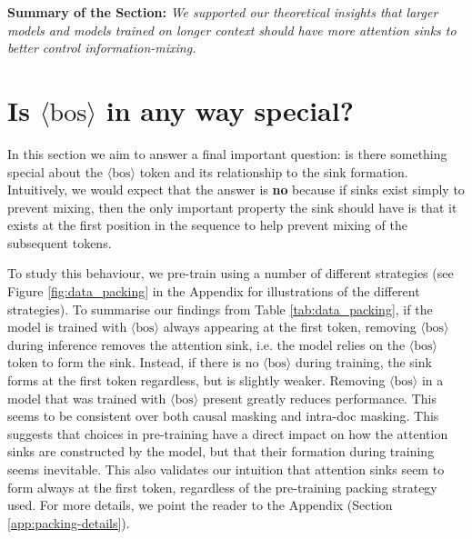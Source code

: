 \documentclass{article} %
\newcommand{\bos}{\ensuremath{\langle\text{bos}\rangle}\xspace}
\begin{document}
\begin{tcolorbox}[boxsep=0mm,left=2.5mm,right=2.5mm] \textbf{Summary of the Section:} {\em We supported our theoretical insights that larger models and models trained on longer context should have more attention sinks to better control information-mixing.}  
\end{tcolorbox}

\section{Is \bos in any way special?}
\label{sec:packing}

In this section we aim to answer a final important question: is there something special about the \bos token and its relationship to the sink formation. Intuitively, we would expect that the answer is \textbf{no} because if sinks exist simply to prevent mixing, then the only important property the sink should have is that it exists at the first position in the sequence to help prevent mixing of the subsequent tokens. 

To study this behaviour, we pre-train using a number of different strategies (see Figure \ref{fig:data_packing} in the Appendix for illustrations of the different strategies). To summarise our findings from Table \ref{tab:data_packing}, if the model is trained with \bos always appearing at the first token, removing \bos during inference removes the attention sink, i.e. the model relies on the \bos token to form the sink. Instead, if there is no \bos during training, the sink forms at the first token regardless, but is slightly weaker. Removing \bos in a model that was trained with \bos present greatly reduces performance. This seems to be consistent over both causal masking and intra-doc masking. This suggests that choices in pre-training have a direct impact on how the attention sinks are constructed by the model, but that their formation during training seems inevitable. This also validates our intuition that attention sinks seem to form always at the first token, regardless of the pre-training packing strategy used. For more details, we point the reader to the Appendix (Section \ref{app:packing-details}).

 
\end{document}

